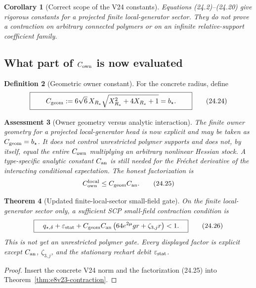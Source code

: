 \documentclass[11pt,oneside]{book}
\newtheorem{theorem}{Theorem}[chapter]
\newtheorem{corollary}[theorem]{Corollary}
\newtheorem{assessment}[theorem]{Assessment}
\theoremstyle{definition}
\newtheorem{definition}[theorem]{Definition}
\theoremstyle{remark}
\begin{document}
\begin{corollary}[Correct scope of the V24 constants]
\label{cor:e8v24-scope}
Equations (24.2)--(24.20) give rigorous constants for a projected
finite local-generator sector.  They do not prove a contraction on
arbitrary connected polymers or on an infinite relative-support
coefficient family.
\end{corollary}

\subsection{What part of \(C_{\rm own}\) is now evaluated}

\begin{definition}[Geometric owner constant]
\label{def:e8v24-Cgeom}
For the concrete radius, define
\[
\boxed{\qquad
C_{\rm geom}:=
6\sqrt6\,X_{R_\star}
\sqrt{X_{R_\star}^2+4X_{R_\star}+1}
=b_\star.
\qquad}                                            \tag{24.24}
\]
\end{definition}

\begin{assessment}[Owner geometry versus analytic interaction]
\label{ass:e8v24-separation}
The finite owner geometry for a projected local-generator head is now
explicit and may be taken as \(C_{\rm geom}=b_\star\).  It does not
control unrestricted polymer supports and does not, by itself, equal
the entire \(C_{\rm own}\) multiplying an arbitrary nonlinear Hessian
stock.  A type-specific analytic constant \(C_{\rm an}\) is still
needed for the Fr\'echet derivative of the interacting conditional
expectation.  The honest factorization is
\[
                         C_{\rm own}^{\rm local}
\leq C_{\rm geom}C_{\rm an}.                       \tag{24.25}
\]
\end{assessment}

\begin{theorem}[Updated finite-local-sector small-field gate]
\label{thm:e8v24-updated-gate}
On the finite local-generator sector only, a sufficient SCP
small-field contraction condition is
\[
\boxed{\quad
q_{\star,\delta}
+\varepsilon_{\rm stat}
+C_{\rm geom}C_{\rm an}
  \left(64e^{2\mu}gr+\zeta_{3,j}r\right)<1.
\quad}                                             \tag{24.26}
\]
This is not yet an unrestricted polymer gate.  Every displayed factor
is explicit except
\(C_{\rm an}\), \(\zeta_{3,j}\), and the stationary rechart debit
\(\varepsilon_{\rm stat}\).
\end{theorem}

\begin{proof}
Insert the concrete V24 norm and the factorization (24.25) into
Theorem~\ref{thm:e8v23-contraction}.
\end{proof}
\end{document}

